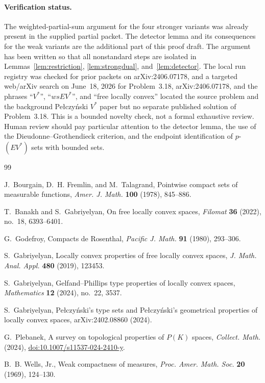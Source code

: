 \documentclass[11pt]{article}
\begin{document}
\paragraph{Verification status.}
The weighted-partial-sum argument for the four stronger variants was already
present in the supplied partial packet.  The detector lemma and its consequences
for the weak variants are the additional part of this proof draft.  The argument
has been written so that all nonstandard steps are isolated in
Lemmas~\ref{lem:restriction}, \ref{lem:strongdual}, and~\ref{lem:detector}.
The local run registry was checked for prior packets on arXiv:2406.07178, and a
targeted web/arXiv search on June~18, 2026 for Problem~3.18, arXiv:2406.07178,
and the phrases ``\(V^\ast\)'', ``\(wsEV^\ast\)'', and ``free locally convex''
located the source problem and the background Pe{\l}czy\'nski \(V^\ast\) paper
but no separate published solution of Problem~3.18.  This is a bounded novelty
check, not a formal exhaustive review.  Human review should pay particular
attention to the detector lemma, the use of the Dieudonne--Grothendieck
criterion, and the endpoint identification of \(p\)-\((EV^\ast)\) sets with
bounded sets.

\begin{thebibliography}{99}

J.~Bourgain, D.~H. Fremlin, and M.~Talagrand,
\newblock Pointwise compact sets of measurable functions,
\newblock \emph{Amer. J. Math.} \textbf{100} (1978), 845--886.

T.~Banakh and S.~Gabriyelyan,
\newblock On free locally convex spaces,
\newblock \emph{Filomat} \textbf{36} (2022), no.~18, 6393--6401.

G.~Godefroy,
\newblock Compacts de Rosenthal,
\newblock \emph{Pacific J. Math.} \textbf{91} (1980), 293--306.

S.~Gabriyelyan,
\newblock Locally convex properties of free locally convex spaces,
\newblock \emph{J. Math. Anal. Appl.} \textbf{480} (2019), 123453.

S.~Gabriyelyan,
\newblock Gelfand--Phillips type properties of locally convex spaces,
\newblock \emph{Mathematics} \textbf{12} (2024), no.~22, 3537.

S.~Gabriyelyan,
\newblock Pe{\l}czy\'nski's type sets and Pe{\l}czy\'nski's geometrical properties
of locally convex spaces,
\newblock arXiv:2402.08860 (2024).

G.~Plebanek,
\newblock A survey on topological properties of $P(K)$ spaces,
\newblock \emph{Collect. Math.} (2024),
\newblock \href{https://doi.org/10.1007/s11537-024-2410-y}{doi:10.1007/s11537-024-2410-y}.

B.~B. Wells, Jr.,
\newblock Weak compactness of measures,
\newblock \emph{Proc. Amer. Math. Soc.} \textbf{20} (1969), 124--130.

\end{thebibliography}
\end{document}
